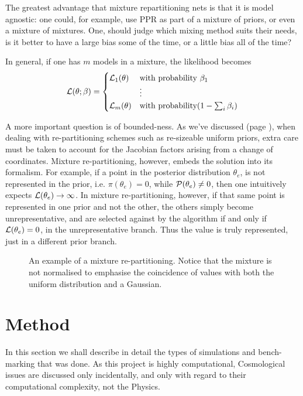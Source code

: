 \documentclass[usenatbib]{mnras}
\begin{document}
The greatest advantage that mixture repartitioning nets is
that it is model agnostic: one could, for example, use PPR as
part of a mixture of priors, or even a mixture of
mixtures. One, should judge which mixing method suits their
needs, is it better to have a large bias some of the time, or
a little bias all of the time?

In general,  if one has \(m\) models in a mixture, the likelihood becomes 
\begin{equation}
  {\cal L}(\theta; \beta)  = \begin{cases}
	{\cal L}_{1}(\theta) &  \text{with probability } \beta_{1}\\
		    &\vdots\\
	{\cal L}_{m}(\theta) & \text{with probability} (1- \sum_{i}\beta_{i})
	\end{cases}
\end{equation}


A more important question is of bounded-ness. As we've discussed
(page \pageref{domain-discussion}), when dealing with re-partitioning
schemes such as re-sizeable uniform priors, extra care must be
taken to account for the Jacobian factors arising from a change of
coordinates. Mixture re-partitioning, however, embeds the solution
into its formalism. For example, if a point in the posterior
distribution \(\theta_{e}\), is not represented in the prior, i.e.
\(\pi(\theta_{e}) = 0\), while \({\cal P}(\theta_{e}) \ne 0\), then
one intuitively expects \({\cal L}(\theta_{e}) \rightarrow
	\infty\). In mixture re-partitioning, however, if that same point is
represented in one prior and not the other, the others simply
become unrepresentative, and are selected against by the algorithm
if and only if \({\cal L}(\theta_{e}) = 0\), in the unrepresentative
branch. Thus the value is truly represented, just in a different
prior branch.

\begin{figure}
 
\caption{\label{org979d14b}
An example of a mixture re-partitioning. Notice that the mixture is not normalised to emphasise the coincidence of values with both the uniform distribution and a Gaussian.}
\end{figure}



\section{Method}
\label{sec:orgbe4fb0b}
In this section we shall describe in detail the types of simulations
and bench-marking that was done. As this project is highly
computational, Cosmological issues are discussed only incidentally,
and only with regard to their computational complexity, not the
Physics.
\end{document}
